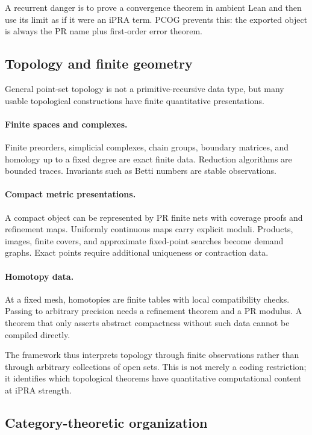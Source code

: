 A recurrent danger is to prove a convergence theorem in ambient Lean and then
use its limit as if it were an iPRA term.  PCOG prevents this: the exported
object is always the PR name plus first-order error theorem.

\subsection{Topology and finite geometry}

General point-set topology is not a primitive-recursive data type, but many
usable topological constructions have finite quantitative presentations.

\paragraph{Finite spaces and complexes.}
Finite preorders, simplicial complexes, chain groups, boundary matrices, and
homology up to a fixed degree are exact finite data.  Reduction algorithms are
bounded traces.  Invariants such as Betti numbers are stable observations.

\paragraph{Compact metric presentations.}
A compact object can be represented by PR finite nets with coverage proofs and
refinement maps.  Uniformly continuous maps carry explicit moduli.  Products,
images, finite covers, and approximate fixed-point searches become demand
graphs.  Exact points require additional uniqueness or contraction data.

\paragraph{Homotopy data.}
At a fixed mesh, homotopies are finite tables with local compatibility
checks.  Passing to arbitrary precision needs a refinement theorem and a PR
modulus.  A theorem that only asserts abstract compactness without such data
cannot be compiled directly.

The framework thus interprets topology through finite observations rather than
through arbitrary collections of open sets.  This is not merely a coding
restriction; it identifies which topological theorems have quantitative
computational content at iPRA strength.

\subsection{Category-theoretic organization}

